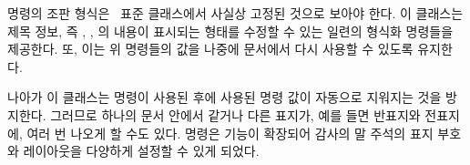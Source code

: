 \begin{comment}
  그림~\ref{fig:titleTH}\와~\ref{fig:titleDB}는 \cmd{\maketitle} 명령을 굳이
  쓰지 않고 일반적인 \ltx 명령을 사용해 표지를 만드는 예를 보여준다.
\end{comment}

\cmd{\maketitle} 명령의 조판 형식은 \ltx\ 표준 클래스에서 사실상 고정된
것으로 보아야 한다.
이 클래스는 제목 정보, 즉 \cmd{\title}, \cmd{\author}, \cmd{\date}의 내용이
표시되는 형태를 수정할 수 있는 일련의 형식화 명령들을 제공한다.
또, 이는 위 명령들의 값을 나중에 문서에서 다시 사용할 수 있도록 유지한다.

나아가 이 클래스는 \cmd{\maketitle} 명령이 사용된 후에 사용된 명령 값이
자동으로 지워지는 것을 방지한다.
그러므로 하나의 문서 안에서 같거나 다른 표지가, 예를 들면 반표지와 전표지에,
여러 번 나오게 할 수도 있다.
\cmd{\thanks} 명령은 기능이 확장되어 감사의 말 주석의 표지 부호와 레이아웃을
다양하게 설정할 수 있게 되었다.

